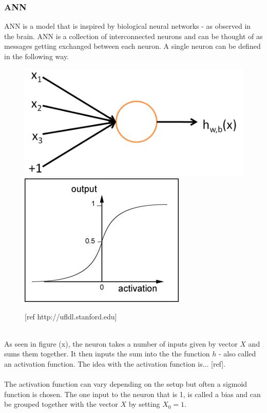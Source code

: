 \documentclass[11pt, a4paper]{article}
\begin{document}
\subsubsection{ANN}
ANN is a model that is inspired by biological neural networks - as observed in the brain. ANN is a collection of interconnected neurons and can be thought of as messages getting exchanged between each neuron. A single neuron can be defined in the following way.
\begin{figure}[!ht]
\centering
\includegraphics[scale=0.2]{SingleNeuron}
\includegraphics[scale=0.5]{sigmoid}
\caption{[ref http://ufldl.stanford.edu]}
\end{figure}
\\
As seen in figure (x), the neuron takes a number of inputs given by vector $ X $ and sums them together. It then inputs the sum into the the function $ h $ - also called an activation function. The idea with the activation function is... [ref].
\\
\\
The activation function can vary depending on the setup but often a sigmoid function is chosen. The one input to the neuron that is 1, is called a bias and can be grouped together with the vector $ X $ by setting $ X_0 = 1 $.
\\
\\
\end{document}
